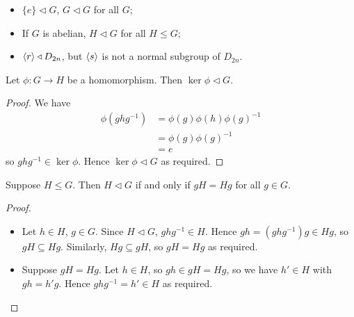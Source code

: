 \documentclass{../template/note}
\begin{document}
    \begin{example}
        \begin{itemize}
            \item \(\{e\} \triangleleft G\), \(G \triangleleft G\) for all \(G\);
            \item If \(G\) is abelian, \(H \triangleleft G\) for all \(H \leq G\);
            \item \(\left \langle r \right \rangle \triangleleft D_{2n}\), but \(\left \langle s \right \rangle\) is not a normal subgroup of \(D_{2n}\).
        \end{itemize}
    \end{example}
    
    \begin{proposition}
        Let \(\phi: G \to H\) be a homomorphism. Then \(\ker \phi \triangleleft G\).
    \end{proposition}
    
    \begin{proof}
        We have
        \begin{align*}
            \phi(ghg^{-1}) &= \phi(g)\phi(h)\phi(g)^{-1} \\
            &= \phi(g)\phi(g)^{-1} \\
            &= e
        \end{align*}
        so \(ghg^{-1} \in \ker \phi\). Hence \(\ker \phi \triangleleft G\) as required.
    \end{proof}

    
    \begin{lemma}
        Suppose \(H \leq G\). Then \(H \triangleleft G\) if and only if \(gH = Hg\) for all \(g \in G\).
        \label{normal-subgroups-equal-cosets}
    \end{lemma}
    
    \begin{proof}
        \begin{itemize}
            \item[\(\implies\)] Let \(h \in H\), \(g \in G\). Since \(H \triangleleft G\), \(ghg^{-1} \in H\). Hence \(gh = (ghg^{-1})g \in Hg\), so \(gH \subseteq Hg\). Similarly, \(Hg \subseteq gH\), so \(gH = Hg\) as required.
            \item[\(\impliedby\)] Suppose \(gH = Hg\). Let \(h \in H\), so \(gh \in gH = Hg\), so we have \(h' \in H\) with \(gh = h'g\). Hence \(ghg^{-1} = h' \in H\) as required. 
        \end{itemize}
    \end{proof}
    
\end{document}
